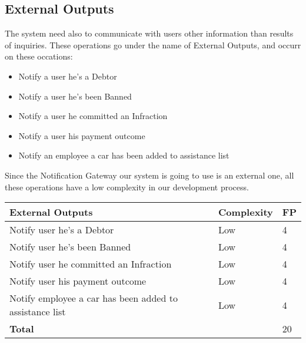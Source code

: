 \subsection{External Outputs}
The system need also to communicate with users other information than results of inquiries. These operations go under the name of External Outputs, and occurr on these occations:
\begin{itemize}
\item Notify a user he's a Debtor
\item Notify a user he's been Banned
\item Notify a user he committed an Infraction
\item Notify a user his payment outcome
\item Notify an employee a car has been added to assistance list
\end{itemize}
Since the Notification Gateway our system is going to use is an external one, all these operations have a low complexity in our development process.
\\
\begin{tabular}{|p{5cm}|p{3cm}|p{2cm}|}
\hline
\textbf{External Outputs} & \textbf{Complexity} & \textbf{FP} \\
\hline

Notify user he's a Debtor & Low & 4\\
Notify user he's been Banned & Low & 4\\
Notify user he committed an Infraction & Low & 4\\
Notify user his payment outcome & Low & 4\\
Notify employee a car has been added to assistance list & Low & 4\\
\hline
\multicolumn{2}{|l|}{\textbf{Total}} & 20\\
\hline
\end{tabular}